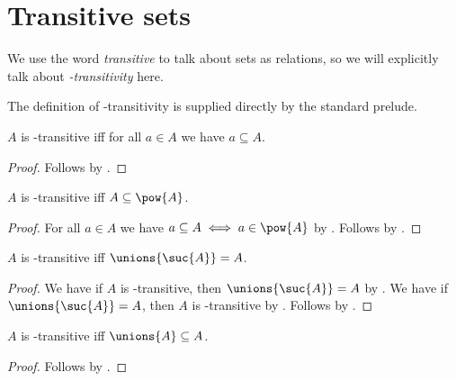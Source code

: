 






\section{Transitive sets}

We use the word \emph{transitive} to talk about sets as relations,
so we will explicitly talk about \emph{\in-transitivity} here.

The definition of \in-transitivity is supplied directly by the standard
prelude.

\begin{proposition}\label{transitiveset_iff_subseteq}
    $A$ is \in-transitive iff
    for all $a\in A$ we have $a\subseteq A$.
\end{proposition}
\begin{proof}
    Follows by .
\end{proof}

\begin{proposition}\label{transitiveset_iff_pow}
    $A$ is \in-transitive iff $A\subseteq \pow{A}$.
\end{proposition}
\begin{proof}
    For all $a\in A$ we have $a\subseteq A \iff a\in\pow{A}$
        by .
    Follows by .
\end{proof}

\begin{proposition}\label{transitiveset_iff_unions_suc}
    $A$ is \in-transitive iff $\unions{\suc{A}} = A$.
\end{proposition}
\begin{proof}
    We have if $A$ is \in-transitive, then $\unions{\suc{A}}=A$
        by .
    We have if $\unions{\suc{A}}=A$, then $A$ is \in-transitive
        by .
    Follows by \auto.
\end{proof}

\begin{proposition}\label{transitiveset_iff_unions_subseteq}
    $A$ is \in-transitive iff $\unions{A}\subseteq A$.
\end{proposition}
\begin{proof}
    Follows by .
\end{proof}

